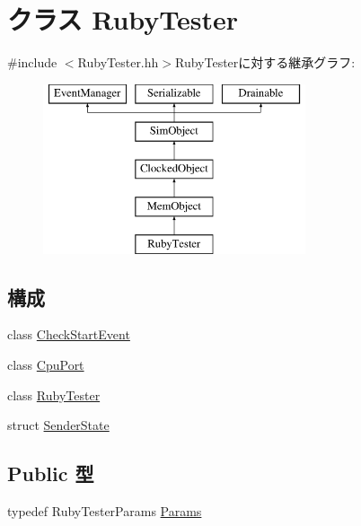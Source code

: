 \hypertarget{classRubyTester}{
\section{クラス RubyTester}
\label{classRubyTester}
}


{\ttfamily \#include $<$RubyTester.hh$>$}RubyTesterに対する継承グラフ:\begin{figure}[H]
\begin{center}
\leavevmode
\includegraphics[height=5cm]{classRubyTester}
\end{center}
\end{figure}
\subsection*{構成}
\begin{DoxyCompactItemize}
\item 
class \hyperlink{classRubyTester_1_1CheckStartEvent}{CheckStartEvent}
\item 
class \hyperlink{classRubyTester_1_1CpuPort}{CpuPort}
\item 
class \hyperlink{classRubyTester_1_1RubyTester}{RubyTester}
\item 
struct \hyperlink{structRubyTester_1_1SenderState}{SenderState}
\end{DoxyCompactItemize}
\subsection*{Public 型}
\begin{DoxyCompactItemize}
\item 
typedef RubyTesterParams \hyperlink{classRubyTester_a6785f65e1745860fc5b53cbf4aefc2f7}{Params}
\end{DoxyCompactItemize}
